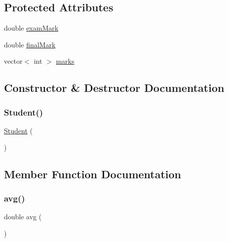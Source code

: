 \subsection*{Protected Attributes}
\begin{DoxyCompactItemize}
\item 
double \mbox{\hyperlink{classStudent_a6b1356b600cbdfe6928d5f020bc35233}{exam\+Mark}}
\item 
double \mbox{\hyperlink{classStudent_ae4f6dc231d21f3ae7386114d1b572cf0}{final\+Mark}}
\item 
vector$<$ int $>$ \mbox{\hyperlink{classStudent_a460302cb4e9860802f65d94255a93811}{marks}}
\end{DoxyCompactItemize}


\subsection{Constructor \& Destructor Documentation}
\mbox{\label{classStudent_a26ceb532f001722145707442f5f26480}} 
\subsubsection{\texorpdfstring{Student()}{Student()}}
{\footnotesize\ttfamily \mbox{\hyperlink{classStudent}{Student}} (\begin{DoxyParamCaption}{ }\end{DoxyParamCaption})\hspace{0.3cm}{\ttfamily [inline]}}



\subsection{Member Function Documentation}
\mbox{\label{classStudent_a6d3f7cc8886fe956a5de14b07e1ca457}} 
\subsubsection{\texorpdfstring{avg()}{avg()}}
{\footnotesize\ttfamily double avg (\begin{DoxyParamCaption}{ }\end{DoxyParamCaption})}

\mbox{\label{classStudent_ae99a413149615469071dc30895d34bca}} 
